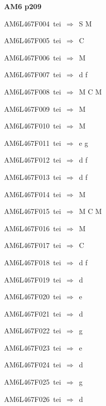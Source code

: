 \par\vfill\eject
{\bf\hfill AM6 p209\hfill\hbox{}}\par\bigskip
{\sixrm AM6L467F004\ {\sixit tei}\ }$\Rightarrow$\ S M\par\smallskip
{\sixrm AM6L467F005\ {\sixit tei}\ }$\Rightarrow$\ C\par\smallskip
{\sixrm AM6L467F006\ {\sixit tei}\ }$\Rightarrow$\ M\par\smallskip
{\sixrm AM6L467F007\ {\sixit tei}\ }$\Rightarrow$\ {\tenit d} {\tenit f}\par\smallskip
{\sixrm AM6L467F008\ {\sixit tei}\ }$\Rightarrow$\ M C M\par\smallskip
{\sixrm AM6L467F009\ {\sixit tei}\ }$\Rightarrow$\ M\par\smallskip
{\sixrm AM6L467F010\ {\sixit tei}\ }$\Rightarrow$\ M\par\smallskip
{\sixrm AM6L467F011\ {\sixit tei}\ }$\Rightarrow$\ {\tenit e} {\tenit g}\par\smallskip
{\sixrm AM6L467F012\ {\sixit tei}\ }$\Rightarrow$\ {\tenit d} {\tenit f}\par\smallskip
{\sixrm AM6L467F013\ {\sixit tei}\ }$\Rightarrow$\ {\tenit d} {\tenit f}\par\smallskip
{\sixrm AM6L467F014\ {\sixit tei}\ }$\Rightarrow$\ M\par\smallskip
{\sixrm AM6L467F015\ {\sixit tei}\ }$\Rightarrow$\ M C M\par\smallskip
{\sixrm AM6L467F016\ {\sixit tei}\ }$\Rightarrow$\ M\par\smallskip
{\sixrm AM6L467F017\ {\sixit tei}\ }$\Rightarrow$\ C\par\smallskip
{\sixrm AM6L467F018\ {\sixit tei}\ }$\Rightarrow$\ {\tenit d} {\tenit f}\par\smallskip
{\sixrm AM6L467F019\ {\sixit tei}\ }$\Rightarrow$\ {\tenit d}\par\smallskip
{\sixrm AM6L467F020\ {\sixit tei}\ }$\Rightarrow$\ {\tenit e}\par\smallskip
{\sixrm AM6L467F021\ {\sixit tei}\ }$\Rightarrow$\ {\tenit d}\par\smallskip
{\sixrm AM6L467F022\ {\sixit tei}\ }$\Rightarrow$\ {\tenit g}\par\smallskip
{\sixrm AM6L467F023\ {\sixit tei}\ }$\Rightarrow$\ {\tenit e}\par\smallskip
{\sixrm AM6L467F024\ {\sixit tei}\ }$\Rightarrow$\ {\tenit d}\par\smallskip
{\sixrm AM6L467F025\ {\sixit tei}\ }$\Rightarrow$\ {\tenit g}\par\smallskip
{\sixrm AM6L467F026\ {\sixit tei}\ }$\Rightarrow$\ {\tenit d}\par\smallskip

